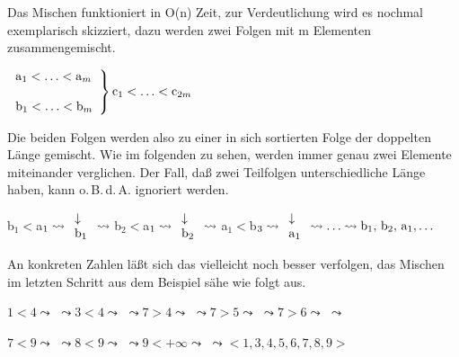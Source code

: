 \documentclass[ngerman]{scrreprt}%
\theoremstyle{break}
\begin{document}
Das Mischen funktioniert in O(n) Zeit, zur Verdeutlichung wird es nochmal exemplarisch skizziert, dazu werden zwei Folgen mit m
Elementen zusammengemischt.

$\left. 
\begin{array}{l}
{\textrm{\textup{a}}}_1<\ldots<{\textrm{\textup{a}}}_m\\
\phantom{leer}\\
{\textrm{\textup{b}}}_1<\ldots<{\textrm{\textup{b}}}_m
\end{array}
\right\} {\textrm{\textup{c}}}_1<\ldots<{\textrm{\textup{c}}}_{2m}$
\bigskip

Die beiden Folgen werden also zu einer in sich sortierten Folge der doppelten Länge gemischt. Wie im folgenden zu sehen, werden immer genau
zwei Elemente miteinander verglichen. Der Fall, daß zwei Teilfolgen unterschiedliche Länge haben, kann o.\,B.\,d.\,A. ignoriert werden.
\bigskip

b$_1<$a$_1 \leadsto \begin{array}{l}
\downarrow\\
{\textrm{\textup{b}}}_1
\end{array} \leadsto$
b$_2<$a$_1 \leadsto \begin{array}{l}
\downarrow\\
{\textrm{\textup{b}}}_2
\end{array} \leadsto$
a$_1<$b$_3 \leadsto \begin{array}{l}
\downarrow\\
{\textrm{\textup{a}}}_1
\end{array} \leadsto \ldots \leadsto {\textrm{\textup{b}}}_1,\,{\textrm{\textup{b}}}_2,\,{\textrm{\textup{a}}}_1, \ldots$
\bigskip

An konkreten Zahlen läßt sich das vielleicht noch besser verfolgen, das Mischen im letzten Schritt aus dem Beispiel sähe wie folgt aus.
\bigskip

$1<4 \leadsto$  $\leadsto
3<4 \leadsto$  $\leadsto
7>4 \leadsto$  $\leadsto 
7>5 \leadsto$  $\leadsto
7>6 \leadsto$  $\leadsto$
\medskip

$7<9 \leadsto$  $\leadsto
8<9 \leadsto$  $\leadsto
9<+\infty \leadsto$  $
\leadsto<1,3,4,5,6,7,8,9>$
\medskip
\end{document}
